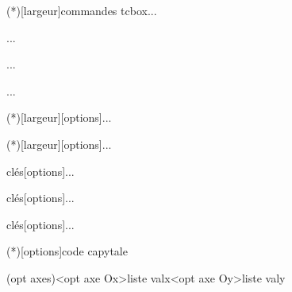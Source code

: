 \documentclass[a4paper,french,11pt]{article}
\begin{document}
\begin{codetex}
\CalculFormelParametres[options]

\begin{CodePythonLst}(*)[largeur]{commandes tcbox}...\end{CodePythonLst}
\begin{CodePiton}[options]...\end{CodePiton}
\begin{CodePythontex}[options]...\end{CodePythontex}
\begin{ConsolePythontex}[options]...\end{ConsolePythontex}
\begin{CodePythonMinted}(*)[largeur][options]...\end{CodePythonMinted}

\begin{PseudoCode}(*)[largeur][options]...\end{PseudoCode}
\end{codetex}

\begin{codetex}
\begin{TerminalWin}[largeur]{clés}[options]...\end{TerminalWin}
\begin{TerminalUnix}[largeur]{clés}[options]...\end{TerminalUnix}
\begin{TerminalOSX}[largeur]{clés}[options]...\end{TerminalOSX}

\CartoucheCapytale(*)[options]{code capytale}
\end{codetex}

\begin{codetex}
\PaveTikz[options]
\TetraedreTikz[options]

\CercleTrigo[clés]
\end{codetex}

\begin{codetex}

\AxesTikz[options]
 
\FenetreTikz \OrigineTikz
\FenetreSimpleTikz[options](opt axes)<opt axe Ox>{liste valx}<opt axe Oy>{liste valy}
\PointMoyenTikz[options]

\BoiteMoustaches[options]
\BoiteMoustachesAxe[options]
\end{codetex}
\end{document}
